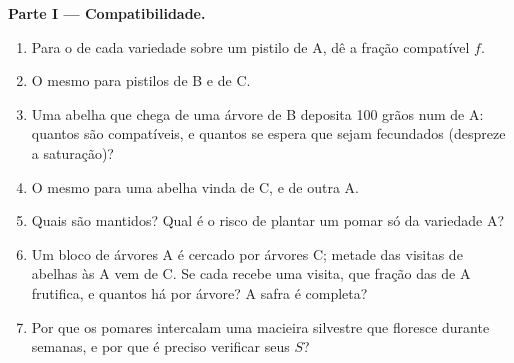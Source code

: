 \begin{problem}
\medskip
\noindent\textbf{Parte I --- Compatibilidade.}
\begin{enumerate}
  \item Para o  de cada variedade sobre um pistilo de A, dê a
        fração compatível $f$.
  \item O mesmo para pistilos de B e de C.
  \item Uma abelha que chega de uma árvore de B deposita 100 grãos
        num  de A: quantos são compatíveis, e quantos  se
        espera que sejam fecundados (despreze a saturação)?
  \item O mesmo para uma abelha vinda de C, e de outra A.
  \item Quais  são mantidos? Qual é o risco de plantar um pomar
        só da variedade A?
  \item Um bloco de árvores A é cercado por árvores C; metade das
        visitas de abelhas às A vem de C. Se cada  recebe uma
        visita, que fração das  de A frutifica, e quantos 
        há por árvore? A safra é completa?
  \item Por que os pomares intercalam uma macieira silvestre que
        floresce durante semanas, e por que é preciso verificar seus
         $S$?
\end{enumerate}


\end{problem}
